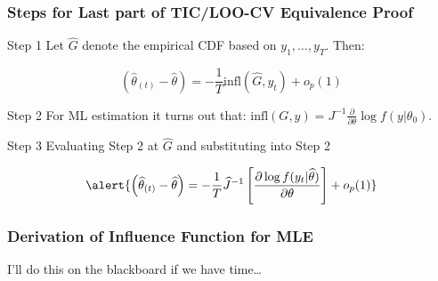 \begin{frame}
  \frametitle{Steps for Last part of TIC/LOO-CV Equivalence Proof} 
 

  \begin{block}{Step 1}
    Let $\widehat{G}$ denote the empirical CDF based on $y_1, \dots, y_T$. Then:
    \vspace{-1em}

   \[
     \left( \widehat{\theta}_{(t)} - \widehat{\theta} \right) = -\frac{1}{T} \text{infl}(\widehat{G}, y_t) + o_p(1)
   \]
  \end{block}

  \vspace{-1em}

  \begin{block}{Step 2}
    For ML estimation it turns out that: $\text{infl}(G,y) = J^{-1} \frac{\partial}{\partial \theta}\log f(y|\theta_0)$.
  \end{block}



  \begin{block}{Step 3}
    Evaluating Step 2 at $\widehat{G}$ and substituting into Step 2

    \vspace{-1em}

\[
  \alert{\left( \widehat{\theta}_{(t)} - \widehat{\theta}  \right) = -\frac{1}{T} \widehat{J}^{-1} \left[\frac{\partial \log f(y_t|\widehat{\theta})}{\partial \theta}\right] + o_p(1)}
\]
  \end{block}

\end{frame}
\begin{frame}
  \frametitle{Derivation of Influence Function for MLE}

  \alert{I'll do this on the blackboard if we have time\dots}
\end{frame}
